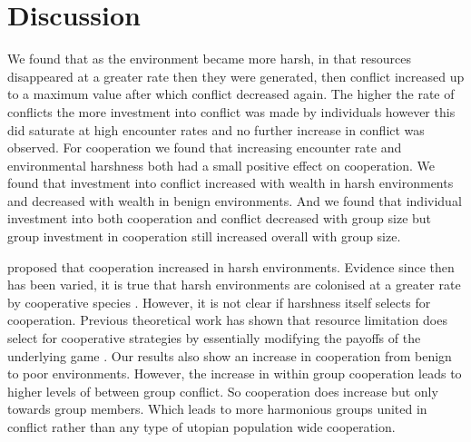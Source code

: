 \section{Discussion}

We found that as the environment became more harsh, in that resources disappeared at a greater rate then they were generated, then conflict increased up to a maximum value after which conflict decreased again. The higher the rate of conflicts the more investment into conflict was made by individuals however this did saturate at high encounter rates and no further increase in conflict was observed. 
For cooperation we found that increasing encounter rate and environmental harshness both had a small positive effect on cooperation. 
We found that investment into conflict increased with wealth in harsh environments and decreased with wealth in benign environments. And we found that individual investment into both cooperation and conflict decreased with group size but group investment in cooperation still increased overall with group size. 

 proposed that cooperation increased in harsh environments. Evidence since then has been varied, it is true that harsh environments are colonised at a greater rate by cooperative species \citep{cornwallisCooperationFacilitates2017}. However, it is not clear if harshness itself selects for cooperation. Previous theoretical work has shown that resource limitation does select for cooperative strategies by essentially modifying the payoffs of the underlying game \citep{requejoEvolutionCooperation2011,smaldinoIncreasedCosts2013b}. Our results also show an increase in cooperation from benign to poor environments. However, the increase in within group cooperation leads to higher levels of between group conflict. So cooperation does increase but only towards group members. Which leads to more harmonious groups united in conflict rather than any type of utopian population wide cooperation.


